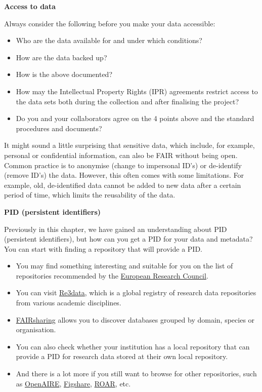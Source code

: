 \documentclass[
]{book}
\providecommand{\tightlist}{%
  \setlength{\itemsep}{0pt}\setlength{\parskip}{0pt}}
\begin{document}
\textbf{Access to data}

Always consider the following before you make your data accessible:

\begin{itemize}
\tightlist
\item
  Who are the data available for and under which conditions?
\item
  How are the data backed up?
\item
  How is the above documented?
\item
  How may the Intellectual Property Rights (IPR) agreements restrict access to the data sets both during the collection and after finalising the project?
\item
  Do you and your collaborators agree on the 4 points above and the standard procedures and documents?
\end{itemize}

It might sound a little surprising that sensitive data, which include, for example, personal or confidential information, can also be FAIR without being open. Common practice is to anonymise (change to impersonal ID's) or de-identify (remove ID's) the data. However, this often comes with some limitations. For example, old, de-identified data cannot be added to new data after a certain period of time, which limits the reusability of the data.

\textbf{PID (persistent identifiers)}

Previously in this chapter, we have gained an understanding about PID (persistent identifiers), but how can you get a PID for your data and metadata? You can start with finding a repository that will provide a PID.

\begin{itemize}
\tightlist
\item
  You may find something interesting and suitable for you on the list of repositories recommended by the \href{https://erc.europa.eu/funding-and-grants/managing-project/open-access}{European Research Council}.
\item
  You can visit \href{https://www.re3data.org/}{Re3data}, which is a global registry of research data repositories from various academic disciplines.
\item
  \href{https://fairsharing.org/search?fairsharingRegistry=Database}{FAIRsharing} allows you to discover databases grouped by domain, species or organisation.
\item
  You can also check whether your institution has a local repository that can provide a PID for research data stored at their own local repository.
\item
  And there is a lot more if you still want to browse for other repositories, such as \href{https://explore.openaire.eu/participate/deposit/learn-how}{OpenAIRE}, \href{https://figshare.com/}{Figshare}, \href{http://roar.eprints.org/}{ROAR}, etc.
\end{itemize}
\end{document}
